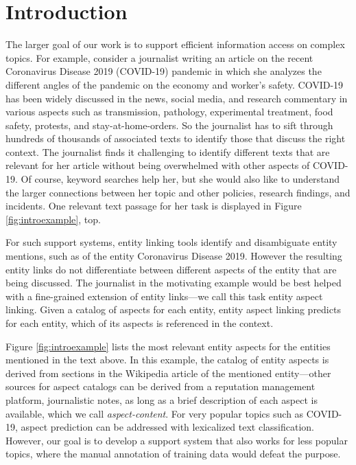\section{Introduction}
\label{sec:Introduction}


The larger goal of our work is to support efficient information access on complex topics. 
%
For example, consider a journalist writing an article on the recent Coronavirus Disease 2019 (COVID-19)
pandemic in which she analyzes the different angles of the pandemic on the economy and worker's safety. COVID-19 has been widely discussed in the news, social media, and research commentary in various aspects such as transmission, pathology, experimental treatment, food safety, protests, and stay-at-home-orders. So the journalist has to sift through hundreds of thousands of associated texts to identify those that discuss the right context. The journalist finds it challenging to identify different texts that are relevant for her article without being overwhelmed with other aspects of COVID-19. Of course, keyword searches help her, but she would also like to understand the larger connections between her topic and other policies, research findings, and incidents. One relevant text passage for her task is displayed in Figure \ref{fig:introexample}, top. 





For such support systems, entity linking tools \cite{ferragina2010tagme,mendes2011dbpedia,piccinno2014wat} identify and disambiguate entity mentions, such as of the entity Coronavirus Disease 2019. However the resulting entity links do not differentiate between different aspects of the entity that are being discussed. The journalist in the motivating example would be best helped with a fine-grained extension of entity links---we call this task entity aspect linking. Given a catalog of aspects for each entity, entity aspect linking predicts for each entity, which of its aspects is referenced in the context. 

 Figure \ref{fig:introexample} lists the most relevant entity aspects for the entities mentioned in the text above.  In this example, the catalog of entity aspects is derived from sections in the Wikipedia article of the mentioned entity---other sources for aspect catalogs can be derived from a reputation management platform, journalistic notes, as long as a brief description of each aspect is available, which we call \emph{aspect-content}.  
 For very popular topics such as COVID-19, aspect prediction can be addressed with lexicalized text classification. However, our goal is to develop a support system that also works for less popular topics, where the manual annotation of training data would defeat the purpose. 


